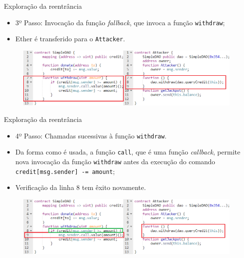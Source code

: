 \begin{frame}{Exploração da reentrância}
    \begin{itemize}
        \item 3º Passo: Invocação da função \textit{fallback}, que invoca a função \texttt{withdraw};
        \item Ether é transferido para o \texttt{Attacker}.
    \end{itemize}
    \begin{figure}[!htb]
     \centering
     \includegraphics[scale=0.45]{figuras/contratos-inteligentes/reentrancia-passo-3.png}
    \end{figure}     
\end{frame}

\begin{frame}{Exploração da reentrância}
    \begin{itemize}
        \item 4º Passo: Chamadas sucessivas à função \texttt{withdraw}.
        \item Da forma como é usada, a função \texttt{call}, que é uma função \textit{callback}, permite nova invocação da função \texttt{withdraw} antes da execução do comando \texttt{credit[msg.sender] -= amount};
        \item Verificação da linha 8 tem êxito novamente.
    \end{itemize}
    \begin{figure}[!htb]
     \centering
     \includegraphics[scale=0.45]{figuras/contratos-inteligentes/reentrancia-passo-4.png}
    \end{figure}     
\end{frame}

